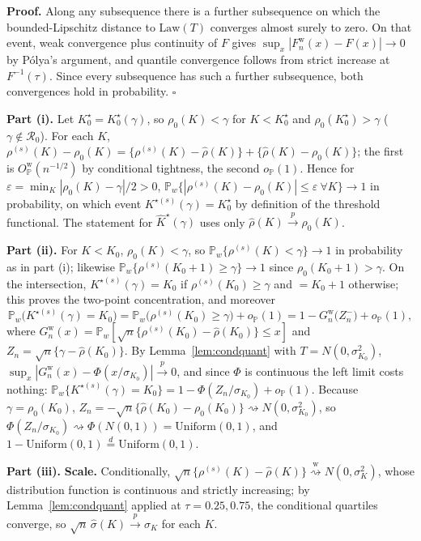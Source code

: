 \documentclass[11pt]{article}
\newcommand{\Pp}{\mathbb P}
\newcommand{\opro}{o_{\Pp}}
\newcommand{\Op}{O_{\Pp}}
\newcommand{\dto}{\rightsquigarrow}
\newcommand{\dtow}{\overset{\mathrm w}{\rightsquigarrow}}
\newcommand{\pto}{\overset{p}{\to}}
\newcommand{\Law}{\mathrm{Law}}
\newcommand{\eps}{\varepsilon}
\begin{document}
\textbf{Proof.} Along any subsequence there is a further subsequence on which the bounded-Lipschitz distance to $\Law(T)$ converges almost surely to zero. On that event, weak convergence plus continuity of $F$ gives $\sup_x|F_n^{\mathrm w}(x)-F(x)|\to0$ by P\'olya's argument, and quantile convergence follows from strict increase at $F^{-1}(\tau)$. Since every subsequence has such a further subsequence, both convergences hold in probability. \hfill$\square$

\textbf{Part (i).} Let $K_0^\star=K^\star_0(\gamma)$, so $\rho_0(K)<\gamma$ for $K<K_0^\star$ and $\rho_0(K_0^\star)>\gamma$ ($\gamma\notin\mathcal R_0$). For each $K$, $\rho^{(s)}(K)-\rho_0(K)=\{\rho^{(s)}(K)-\hat\rho(K)\}+\{\hat\rho(K)-\rho_0(K)\}$; the first is $\Op^{\mathrm w}(n^{-1/2})$ by conditional tightness, the second $\opro(1)$. Hence for $\eps=\min_K|\rho_0(K)-\gamma|/2>0$, $\Pp_w\{|\rho^{(s)}(K)-\rho_0(K)|\le\eps\ \forall K\}\to1$ in probability, on which event $K^{\star(s)}(\gamma)=K_0^\star$ by definition of the threshold functional. The statement for $\widehat K^\star(\gamma)$ uses only $\hat\rho(K)\pto\rho_0(K)$.

\textbf{Part (ii).} For $K<K_0$, $\rho_0(K)<\gamma$, so $\Pp_w\{\rho^{(s)}(K)<\gamma\}\to1$ in probability as in part (i); likewise $\Pp_w\{\rho^{(s)}(K_0+1)\ge\gamma\}\to1$ since $\rho_0(K_0+1)>\gamma$. On the intersection, $K^{\star(s)}(\gamma)=K_0$ if $\rho^{(s)}(K_0)\ge\gamma$ and $=K_0+1$ otherwise; this proves the two-point concentration, and moreover
\begin{equation*}
\Pp_w\bigl(K^{\star(s)}(\gamma)=K_0\bigr)
=\Pp_w\bigl(\rho^{(s)}(K_0)\ge\gamma\bigr)+\opro(1)
=1-G_n^{\mathrm w}\bigl(Z_n^-\bigr)+\opro(1),
\end{equation*}
where $G_n^{\mathrm w}(x)=\Pp_w[\sqrt n\{\rho^{(s)}(K_0)-\hat\rho(K_0)\}\le x]$ and $Z_n=\sqrt n\{\gamma-\hat\rho(K_0)\}$. By Lemma~\ref{lem:condquant} with $T=N(0,\sigma_{K_0}^2)$, $\sup_x|G_n^{\mathrm w}(x)-\Phi(x/\sigma_{K_0})|\pto0$, and since $\Phi$ is continuous the left limit costs nothing:
$\Pp_w\{K^{\star(s)}(\gamma)=K_0\}=1-\Phi(Z_n/\sigma_{K_0})+\opro(1)$.
Because $\gamma=\rho_0(K_0)$, $Z_n=-\sqrt n\{\hat\rho(K_0)-\rho_0(K_0)\}\dto N(0,\sigma_{K_0}^2)$, so $\Phi(Z_n/\sigma_{K_0})\dto\Phi(N(0,1))=\mathrm{Uniform}(0,1)$, and $1-\mathrm{Uniform}(0,1)\overset d=\mathrm{Uniform}(0,1)$.

\textbf{Part (iii).} \textbf{Scale.} Conditionally, $\sqrt n\{\rho^{(s)}(K)-\hat\rho(K)\}\dtow N(0,\sigma_K^2)$, whose distribution function is continuous and strictly increasing; by Lemma~\ref{lem:condquant} applied at $\tau=0.25,0.75$, the conditional quartiles converge, so $\sqrt n\,\hat\sigma(K)\pto\sigma_K$ for each $K$.
\end{document}
